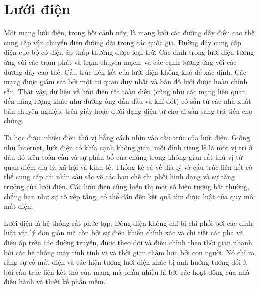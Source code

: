 \section{Lưới điện}
Một mạng lưới điện, trong bối cảnh này, là mạng lưới các đường dây điện cao thế cung cấp vận chuyển điện đường dài trong các quốc gia. Đường dây cung cấp điện cục bộ có điện áp thấp thường được loại trừ. Các đỉnh trong lưới điện tương ứng với các trạm phát và trạm chuyển mạch, và các cạnh tương ứng với các đường dây cao thế. Cấu trúc liên kết của lưới điện không khó để xác định. Các mạng được giám sát bởi một cơ quan duy nhất và bản đồ lưới được hoàn chỉnh sẵn. Thật vậy, dữ liệu về lưới điện rất toàn diện (cũng như các mạng liên quan đến năng lượng khác như đường ống dẫn dầu và khí đốt) có sẵn từ các nhà xuất bản chuyên nghiệp, trên giấy hoặc dưới dạng điện tử cho ai sẵn sàng trả tiền cho chúng.\par
Ta học được nhiều điều thú vị bằng cách nhìn vào cấu trúc của lưới điện. Giống như Internet, lưới điện có khía cạnh không gian, mỗi đỉnh riêng lẻ là một vị trí ở đâu đó trên toàn cầu và sự phân bố của chúng trong không gian rất thú vị từ quan điểm địa lý, xã hội và kinh tế. Thống kê cả về địa lý và cấu trúc liên kết có thể cung cấp cái nhìn sâu sắc về các hạn chế chi phối hình dạng và sự tăng trưởng của lưới điện. Các lưới điện cũng hiển thị một số hiện tượng bất thường, chẳng hạn như sự cố xếp tầng, có thể dẫn đến kết quả tìm được luật của quy mô mất điện.\par
Lưới điện là hệ thống rất phức tạp. Dòng điện không chỉ bị chi phối bởi các định luật vật lý đơn giản mà còn bởi sự điều khiển chính xác và chi tiết các pha và điện áp trên các đường truyền, được theo dõi và điều chỉnh theo thời gian nhanh bởi các hệ thống máy tính tinh vi và thời gian chậm hơn bởi con người. Nó chỉ ra rằng sự cố mất điện và các hiện tượng lưới điện khác bị ảnh hưởng tương đối ít bởi cấu trúc liên kết thô của mạng mà phần nhiều là bởi các hoạt động của nhà điều hành và thiết kế phần mềm.\par

